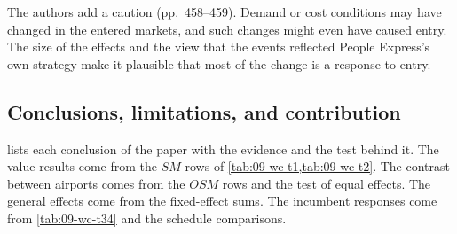 The authors add a caution (pp.~458--459). Demand or cost conditions may have changed in the
entered markets, and such changes might even have caused entry. The size of the effects and the view
that the events reflected People Express's own strategy make it plausible that most of the change is
a response to entry.

\subsection{Conclusions, limitations, and contribution}\label{sec:09-wc-concl}

 lists each conclusion of the paper with the evidence and the test behind it.
The value results come from the $\mathit{SM}$ rows of \cref{tab:09-wc-t1,tab:09-wc-t2}. The contrast
between airports comes from the $\mathit{OSM}$ rows and the test of equal effects. The general effects
come from the fixed-effect sums. The incumbent responses come from \cref{tab:09-wc-t34} and the
schedule comparisons.

